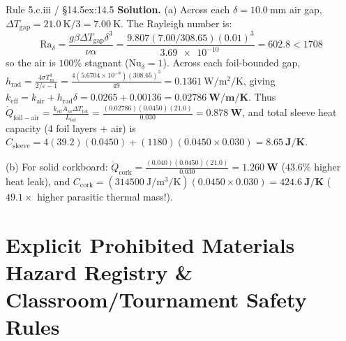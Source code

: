 \begin{twocol}[0.50]
\begin{workedexample}{Rule 5.c.iii / §14.5}{ex:14.5}
\textbf{Solution.}
(a) Across each $\delta = \SI{10.0}{\milli\meter}$ air gap, $\Delta T_{\mathrm{gap}} = \SI{21.0}{\kelvin}/3 = \SI{7.00}{\kelvin}$. The Rayleigh number is:
\[
  \mathrm{Ra}_\delta = \frac{g\beta\Delta T_{\mathrm{gap}}\delta^3}{\nu\alpha} = \frac{9.807(7.00/308.65)(0.01)^3}{\SI{3.69e-10}{}} = \mathbf{602.8} < 1708
\]
so the air is $100\%$ stagnant ($\mathrm{Nu}_\delta = 1$). Across each foil-bounded gap, $h_{\mathrm{rad}} = \frac{4\sigma T_m^3}{2/\varepsilon - 1} = \frac{4(5.6704\times 10^{-8})(308.65)^3}{49} = \SI{0.1361}{\watt\per\square\meter\per\kelvin}$, giving $k_{\mathrm{eff}} = k_{\mathrm{air}} + h_{\mathrm{rad}}\delta = 0.0265 + 0.00136 = \mathbf{\SI{0.02786}{\watt\per\meter\per\kelvin}}$. Thus $\dot{Q}_{\mathrm{foil-air}} = \frac{k_{\mathrm{eff}}A_m\Delta T_{\mathrm{tot}}}{L_{\mathrm{tot}}} = \frac{(0.02786)(0.0450)(21.0)}{0.030} = \mathbf{\SI{0.878}{\watt}}$, and total sleeve heat capacity (4 foil layers + air) is $C_{\mathrm{sleeve}} = 4(39.2)(0.0450) + (1180)(0.0450\times 0.030) = \mathbf{\SI{8.65}{\joule\per\kelvin}}$.

(b) For solid corkboard: $\dot{Q}_{\mathrm{cork}} = \frac{(0.040)(0.0450)(21.0)}{0.030} = \mathbf{\SI{1.260}{\watt}}$ ($43.6\%$ higher heat leak), and $C_{\mathrm{cork}} = (\SI{314500}{\joule\per\cubic\meter\per\kelvin})(0.0450\times 0.030) = \mathbf{\SI{424.6}{\joule\per\kelvin}}$ ($49.1\times$ higher parasitic thermal mass!).
\end{workedexample}
\end{twocol}

\section{Explicit Prohibited Materials Hazard Registry \& Classroom/Tournament Safety Rules}\label{sec:14.6}

